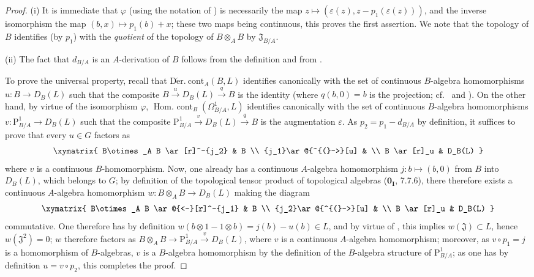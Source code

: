 \begin{proof}
(i) It is immediate that $\varphi$ (using the notation of ) is necessarily the map $z\mapsto(\varepsilon(z),z-p_1(\varepsilon(z)))$, and the inverse isomorphism the map $(b,x)\mapsto p_1(b)+x$; these two maps being continuous, this proves the first assertion.
We note that the topology of $B$ identifies (by $p_1$) with the \emph{quotient} of the topology of $B\otimes_A B$ by $\mathfrak{J}_{B/A}$.

(ii) The fact that $d_{B/A}$ is an $A$-derivation of $B$ follows from the definition  and from .

To prove the universal property, recall that $\operatorname{D\acute{e}r.\ cont}_A(B,L)$ identifies canonically with the set of continuous $B$-algebra homomorphisms $u:B\to D_B(L)$ such that the composite $B\xrightarrow{u}D_B(L)\xrightarrow{q}B$ is the identity (where $q(b,0)=b$ is the projection; cf.\  and ).
On the other hand, by virtue of the isomorphism $\varphi$, $\operatorname{Hom.\ cont}_B(\Omega^1_{B/A},L)$ identifies canonically with the set of continuous $B$-algebra homomorphisms $v:\mathrm{P}^1_{B/A}\to D_B(L)$ such that the composite $\mathrm{P}^1_{B/A}\xrightarrow{v}D_B(L)\xrightarrow{q}B$ is the augmentation $\varepsilon$.
As $p_2=p_1-d_{B/A}$ by definition, it suffices to prove that every $u\in G$ factors as
\[
\xymatrix{
  B\otimes_A B \ar[r]^-{j_2} & B \\
  {j_1}\ar@{^{(}->}[u] & \\
  B \ar[r]_u & D_B(L)
}
\]
where $v$ is a continuous $B$-homomorphism.
Now, one already has a continuous $A$-algebra homomorphism $j:b\mapsto(b,0)$ from $B$ into $D_B(L)$, which belongs to $G$; by definition of the topological tensor product of topological algebras ($\mathbf{0_I}$, 7.7.6), there therefore exists a continuous $A$-algebra homomorphism $w:B\otimes_A B\to D_B(L)$ making the diagram
\[
\xymatrix{
  B\otimes_A B \ar@{<-}[r]^-{j_1} & B \\
  {j_2}\ar@{^{(}->}[u] & \\
  B \ar[r]_u & D_B(L)
}
\]
commutative.
One therefore has by definition $w(b\otimes 1-1\otimes b)=j(b)-u(b)\in L$, and by virtue of , this implies $w(\mathfrak{J})\subset L$, hence $w(\mathfrak{J}^2)=0$; $w$ therefore factors as $B\otimes_A B\to\mathrm{P}^1_{B/A}\xrightarrow{v}D_B(L)$, where $v$ is a continuous $A$-algebra homomorphism; moreover, as $v\circ p_1=j$ is a homomorphism of $B$-algebras, $v$ is a $B$-algebra homomorphism by the definition of the $B$-algebra structure of $\mathrm{P}^1_{B/A}$; as one has by definition $u=v\circ p_2$, this completes the proof.
\end{proof}

